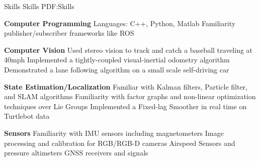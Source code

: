 \documentclass[letterpaper,MMMyyyy,nonstopmode]{simpleresumecv}
\begin{document}
\begin{Body}



\Section
{Skills}
{Skills}
{PDF:Skills}

\Entry
{\textbf{Computer Programming}}
\Gap
\BulletItem
Languages: C++, Python, Matlab
\BulletItem
Familiarity publisher/subscriber frameworks like ROS


\Gap
\Entry
{\textbf{Computer Vision}}
\Gap
\BulletItem
Used stereo vision to track and catch a baseball traveling at  40mph
\BulletItem
Implemented a tightly-coupled visual-inertial odometry algorithm
\BulletItem
Demonstrated a lane following algorithm on a small scale self-driving car

\Gap
\Entry
{\textbf{State Estimation/Localization}}
\Gap
\BulletItem
Familiar with Kalman filters, Particle filter, and SLAM algorithms
\BulletItem
Familiarity with factor graphs and non-linear optimization techniques over Lie Groups
\BulletItem
Implemented a Fixed-lag Smoother in real time on Turtlebot data

\Gap
\Entry
{\textbf{Sensors}}
\Gap
\BulletItem
Familiarity with IMU sensors including magnetometers
\BulletItem
Image processing and calibration for RGB/RGB-D cameras
\BulletItem
Airspeed Sensors and pressure altimeters
\BulletItem
GNSS receivers and signals



\end{Body}
\end{document}
